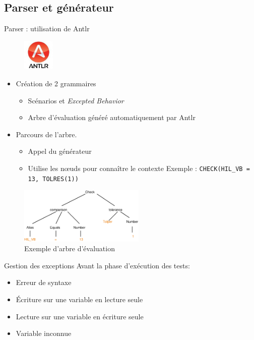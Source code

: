 \documentclass{beamer}
\begin{document}
\subsection{Parser et g\'en\'erateur}
\begin{frame}{Parser : utilisation de Antlr}
~
\begin{figure}
	\includegraphics[width=1.5cm]{antlr.jpg}
\end{figure}
	\vspace{-20px}
	\begin{itemize}
		\item Création de 2 grammaires 
			\begin{itemize}
				\item Scénarios et \textit{Excepted Behavior}
				\item Arbre d'évaluation généré automatiquement par Antlr
			\end{itemize}
		\item Parcours de l'arbre. 
			\begin{itemize}
				\item Appel du générateur
				\item Utilise les n\oe{}uds pour connaître le contexte\newline 
				\scriptsize Exemple : \texttt{CHECK(HIL\_VB = 13, TOLRES(1))}
			\end{itemize}
	\end{itemize}
	\begin{figure}[h]
		\centering
		\includegraphics[width=6cm]{treeCheck.eps}
		\caption{Exemple d'arbre d'évaluation}
	\end{figure}
	\end{frame}
	\begin{frame}{Gestion des exceptions}
	\footnotesize
	Avant la phase d'exécution des tests: 
	\normalsize
			\begin{itemize}
					\vspace{-10px}
		\item Erreur de syntaxe
		\item Écriture sur une variable en lecture seule
		\item Lecture sur une variable en écriture seule
		\item Variable inconnue 
		\end{itemize}
\end{frame}
\end{document}
